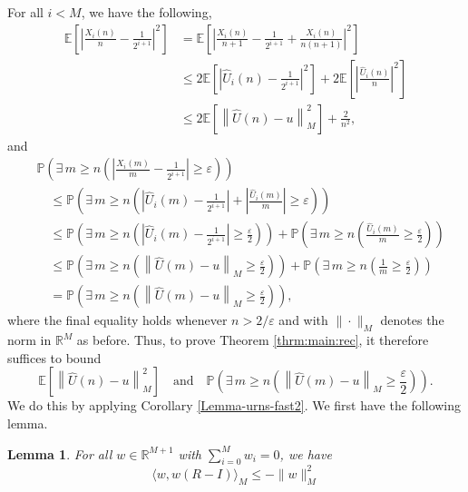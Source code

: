 \documentclass[12pt]{amsart}
\newtheorem{lemma}[theorem]{Lemma}
\theoremstyle{definition}
\theoremstyle{remark}
\newcommand{\RR}{\mathbb{R}}
\newcommand{\PP}{\mathbb{P}}
\newcommand{\EE}{\mathbb{E}}
\begin{document}
For all $i < M$, we have the following,
\begin{align*}
    \EE\left[\left|\frac{X_i(n)}{n} - \frac{1}{2^{i+1}}\right|^2\right]
    &= \EE\left[\left|\frac{X_i(n)}{n+1} -\frac{1}{2^{i+1}} 
        + \frac{X_i(n)}{n(n+1)}\right|^2\right] \\
    &\leq 2\EE\left[\left|\hat{U}_i(n) - \frac{1}{2^{i+1}}\right|^2\right] 
        + 2\EE\left[\left|\frac{\hat{U}_i(n)}{n}\right|^2\right] \\
    &\leq 2\EE\left[\left\|\hat{U}(n) - u\right\|_M^2\right] + \frac{2}{n^2},
\end{align*}
and
\begin{align*}
  &\PP\left(\exists\, m \geq n \left(\left|\frac{X_i(m)}{m} 
      - \frac{1}{2^{i+1}}\right| \geq \varepsilon\right)\right)\\
  &\quad\leq \PP\left(\exists\, m \geq n \left(\left|\hat{U}_i(m) 
      - \frac{1}{2^{i+1}}\right| + \left|\frac{\hat{U}_i(m)}{m}\right| 
      \geq \varepsilon\right)\right) \\
  &\quad\leq \PP\left(\exists\, m \geq n \left(\left|\hat{U}_i(m) 
      - \frac{1}{2^{i+1}}\right| \geq \frac{\varepsilon}{2}\right)\right) 
    + \PP\left(\exists\, m \geq n \left(\frac{\hat{U}_i(m)}{m}
      \geq \frac{\varepsilon}{2}\right)\right) \\
  &\quad\leq \PP\left(\exists\, m \geq n \left(
      \left\|\hat{U}(m) - u\right\|_M \geq \frac{\varepsilon}{2}\right)\right) 
    + \PP\left(\exists\, m \geq n \left(\frac{1}{m} \geq \frac{\varepsilon}{2}
      \right)\right) \\
  &\quad= \PP\left(\exists\, m \geq n \left(
      \left\|\hat{U}(m) - u\right\|_M \geq \frac{\varepsilon}{2}\right)\right),
\end{align*}
where the final equality holds whenever $n > 2/\varepsilon$ and with $\|\cdot\|_M$ denotes the norm in $\RR^M$ as before. Thus, to prove Theorem \ref{thrm:main:rec}, it therefore suffices 
to bound
\[
\EE\left[\left\|\hat{U}(n) - u\right\|_M^2\right] \quad \text{and} \quad 
\PP\left(\exists\, m \geq n \left(\left\|\hat{U}(m) - u\right\|_M 
\geq \frac{\varepsilon}{2}\right)\right).
\]
We do this by applying Corollary \ref{Lemma-urns-fast2}. We first have the following lemma.
\begin{lemma}
\label{lem:rec:ineq}
    For all $w \in \RR^{M+1}$ with $\sum_{i=0}^{M}w_i =0$, we have 
    \[
    \langle w, w(R- I)\rangle_M \le -\|w\|_M^2
    \]
\end{lemma}
\end{document}

